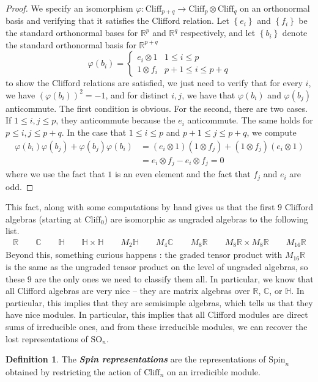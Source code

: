 \documentclass[psamsfonts, 12pt]{amsart}
\theoremstyle{definition}
\newtheorem{defn}[thm]{Definition}
\theoremstyle{remark}
\newcommand{\R}{\mathbb{R}}
\newcommand{\ib}[1]{\textbf{\textit{#1}}}
\renewcommand{\H}{\mathbb{H}}
\newcommand{\C}{\mathbb{C}}
\newcommand{\SO}{\mathrm{SO}}
\newcommand{\Cliff}{\mathrm{Cliff}}
\newcommand{\Spin}{\mathrm{Spin}}
\newcommand{\set}[1]{\left\lbrace #1 \right\rbrace}
\begin{document}
\begin{proof}
We specify an isomorphism $\varphi : \Cliff_{p+q} \to \Cliff_p \otimes \Cliff_q$
on an orthonormal basis and verifying that it satisfies the Clifford relation. Let
$\set{e_i}$ and $\set{f_i}$ be the standard orthonormal bases for $\R^p$ and $\R^q$
respectively, and let $\set{b_i}$ denote the standard orthonormal basis for $\R^{p+q}$
\[
\varphi(b_i) = \begin{cases}
e_i \otimes 1 & 1 \leq i \leq p \\
1 \otimes f_i & p+1 \leq i \leq p+q
\end{cases}
\]
to show the Clifford relations are satisfied, we just need to verify that for every $i$,
we have $(\varphi(b_i))^2 = -1$, and for distinct $i,j$, we have that
$\varphi(b_i)$ and $\varphi(b_j)$ anticommute. The first condition is obvious. For
the second, there are two cases. If $1 \leq i,j \leq p$, they anticommute because the
$e_i$ anticommute. The same holds for $p \leq i,j \leq p+q$. In the case that
$1 \leq i \leq p$ and $p+1 \leq j \leq p+q$, we compute
\begin{align*}
\varphi(b_i)\varphi(b_j) + \varphi(b_j)\varphi(b_i) &= (e_i \otimes 1)(1 \otimes f_j)
+ (1 \otimes f_j)(e_i \otimes 1) \\
&= e_i \otimes f_j - e_i \otimes f_j = 0
\end{align*}
where we use the fact that $1$ is an even element and the fact that $f_j$ and $e_i$
are odd.
\end{proof}
%
This fact, along with some computations by hand gives us that the first
$9$ Clifford algebras (starting at $\Cliff_0$) are isomorphic as ungraded algebras
to the following list.
\begin{align*}
\R \qquad \C \qquad \H \qquad \H \times \H \qquad M_2\H \qquad M_4\C \qquad M_8\R
\qquad M_8\R \times M_8\R \qquad M_{16}\R
\end{align*}
%
Beyond this, something curious happens : the graded tensor product with $M_{16}\R$
is the same as the ungraded tensor product on the level of ungraded algebras, so
these $9$ are the only ones we need to classify them all. In particular, we know
that all Clifford algebras are very nice -- they are matrix algebras over
$\R$, $\C$, or $\H$. In particular, this implies that they are semisimple algebras,
which tells us that they have nice modules. In particular, this implies that all Clifford modules
are direct sums of irreducible ones, and from these irreducible modules, we can recover
the lost representations of $\SO_n$.
%
\begin{defn}
The \ib{Spin representations} are the representations of $\Spin_n$ obtained by
restricting the action of $\Cliff_n$ on an irredicible module.
\end{defn}
\end{document}
